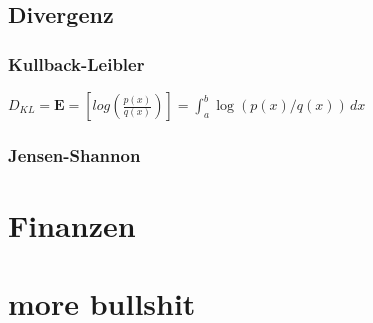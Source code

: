 \documentclass{scrreprt}
\begin{document}
\subsection{Divergenz}\label{Divergenz}
\subsubsection{Kullback-Leibler}\label{Kullback-Leibler}
$D_{KL}=\mathbf{E}=[log(\frac{p(x)}{q(x)} )]= \int_{a}^{b}  \log (p(x)/q(x))\,dx  $
\subsubsection{Jensen-Shannon}\label{Jensen-Shannon}
\section*{Finanzen}\label{Finanzen}
%
\section{more bullshit}
\end{document}
